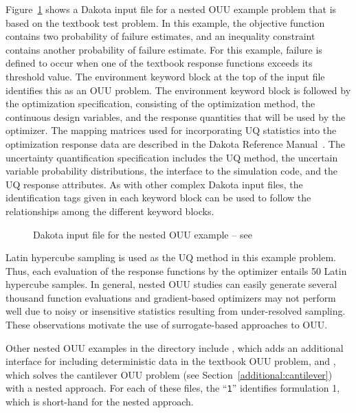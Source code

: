 Figure~\ref{adv_models:figure09} shows a Dakota input file for a nested
OUU example problem that is based on the textbook test problem.
In this example, the objective
function contains two probability of failure estimates, and an
inequality constraint contains another probability of failure
estimate. For this example, failure is defined to occur when one of
the textbook response functions exceeds its threshold value. The
environment keyword block at the top of the input file identifies this as
an OUU problem. The environment keyword block is followed by the
optimization specification, consisting of the optimization method, the
continuous design variables, and the response quantities that will be
used by the optimizer. The mapping matrices used for incorporating UQ
statistics into the optimization response data are described in the
Dakota Reference Manual~\cite{RefMan}. The uncertainty quantification
specification includes the UQ method, the uncertain variable
probability distributions, the interface to the simulation code, and
the UQ response attributes. As with other complex Dakota input files,
the identification tags given in each keyword block can be used to
follow the relationships among the different keyword blocks.

\begin{figure}
  \centering
  \begin{bigbox}
    \begin{tiny}
    \end{tiny}
  \end{bigbox}
  \caption{Dakota input file for the nested OUU example --
see \protect{} }
  \label{adv_models:figure09}
\end{figure}

Latin hypercube sampling is used as the UQ method in this example
problem. Thus, each evaluation of the response functions by the
optimizer entails 50 Latin hypercube samples. In general, nested OUU
studies can easily generate several thousand function evaluations and
gradient-based optimizers may not perform well due to noisy or
insensitive statistics resulting from under-resolved sampling. These
observations motivate the use of surrogate-based approaches to OUU.

Other nested OUU examples in the  directory
include , which adds an additional
interface for including deterministic data in the textbook OUU
problem, and , which solves the
cantilever OUU problem (see Section~\ref{additional:cantilever}) with
a nested approach. For each of these files, the ``\texttt{1}''
identifies formulation 1, which is short-hand for the nested approach.


